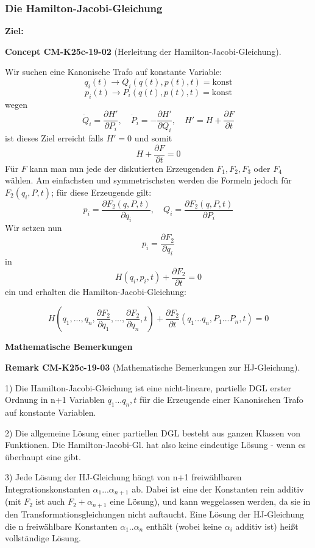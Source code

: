 \documentclass[10pt, letterpaper]{article}
\newcommand{\CustomHeading}[3]{%
  \par\medskip\noindent%
  \textbf{#1 #2} \textnormal{(#3)}.\enskip%
}
\newenvironment{REM}[2]{\begin{unitbox}\CustomHeading{Remark}{#1}{#2}}{\end{unitbox}}
\newenvironment{CONC}[2]{\begin{unitbox}\CustomHeading{Concept}{#1}{#2}}{\end{unitbox}}
\begin{document}
\subsubsection*{Die Hamilton-Jacobi-Gleichung}

\textbf{Ziel:} 

\begin{CONC}{CM-K25c-19-02}{Herleitung der Hamilton-Jacobi-Gleichung}
Wir suchen eine Kanonische Trafo auf konstante Variable:
\[q_i(t) \rightarrow Q_i(q(t),p(t),t) = \text{konst}\]
\[p_i(t) \rightarrow P_i(q(t),p(t),t) = \text{konst}\]
wegen
\[\dot{Q}_i = \frac{\partial H'}{\partial P_i}, \quad \dot{P}_i = -\frac{\partial H'}{\partial Q_i}, \quad H' = H + \frac{\partial F}{\partial t}\]
ist dieses Ziel erreicht falls $H' = 0$ und somit
\[H + \frac{\partial F}{\partial t} = 0\]
Für $F$ kann man nun jede der diskutierten Erzeugenden $F_1, F_2, F_3$ oder $F_4$ wählen. Am einfachsten und symmetrischsten werden die Formeln jedoch für $F_2(q_i,P,t)$; für diese Erzeugende gilt:
\[
p_i = \frac{\partial F_2(q,P,t)}{\partial q_i}, \quad Q_i = \frac{\partial F_2(q,P,t)}{\partial P_i}
\]
Wir setzen nun 
$$p_i = \frac{\partial F_2}{\partial q_i}$$ 
in 
$$H(q_i,p_i,t) + \frac{\partial F_2}{\partial t} = 0$$ 
ein und erhalten die Hamilton-Jacobi-Gleichung:


$$H(q_1,...,q_n,\frac{\partial F_2}{\partial q_1},...,\frac{\partial F_2}{\partial q_n},t) + \frac{\partial F_2}{\partial t}(q_1...q_n,P_1...P_n,t) = 0$$
\end{CONC}




\textbf{Mathematische Bemerkungen}

\begin{REM}{CM-K25c-19-03}{Mathematische Bemerkungen zur HJ-Gleichung}
1) Die Hamilton-Jacobi-Gleichung ist eine nicht-lineare, partielle DGL erster Ordnung in n+1 Variablen $q_1...q_n,t$ für die Erzeugende einer Kanonischen Trafo auf konstante Variablen.

2) Die allgemeine Lösung einer partiellen DGL besteht aus ganzen Klassen von Funktionen. Die Hamilton-Jacobi-Gl. hat also keine eindeutige Lösung - wenn es überhaupt eine gibt.

3) Jede Lösung der HJ-Gleichung hängt von n+1 freiwählbaren Integrationskonstanten $\alpha_1...\alpha_{n+1}$ ab. Dabei ist eine der Konstanten rein additiv (mit $F_2$ ist auch $F_2 + \alpha_{n+1}$ eine Lösung), und kann weggelassen werden, da sie in den Transformationsgleichungen nicht auftaucht. Eine Lösung der HJ-Gleichung die n freiwählbare Konstanten $\alpha_1..\alpha_n$ enthält (wobei keine $\alpha_i$ additiv ist) heißt vollständige Lösung.
\end{REM}
\end{document}
